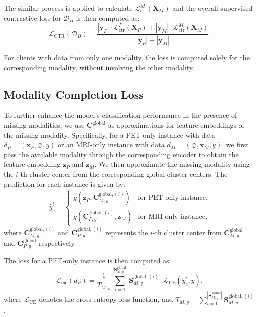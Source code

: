 The similar process is applied to calculate \( \mathcal{L}_{\text{ctr}}^M(\mathbf{X}_M) \) and the overall supervised contrastive loss for $\mathcal{D}_B$ is then computed as:
\begin{equation}
    \mathcal{L}_{\text{CTR}} (\mathcal{D}_B)= 
    \frac{
        |\mathbf{y}_P| \cdot \mathcal{L}_{\text{ctr}}^P(\mathbf{X}_P) 
        + 
        |\mathbf{y}_M| \cdot \mathcal{L}_{\text{ctr}}^M(\mathbf{X}_M)
    }{
        |\mathbf{y}_P| + |\mathbf{y}_M|
    }.
\end{equation}

For clients with data from only one modality, the loss is computed solely for the corresponding modality, without involving the other modality. 

\subsection{Modality Completion Loss}
To further enhance the model's classification performance in the presence of missing modalities, we use $\mathbf{C}^{\mathrm{global}}$ as approximations for feature embeddings of the missing modality. Specifically, for a PET-only instance with data \( d_P = (\mathbf{x}_P, \varnothing, y) \) or an MRI-only instance with data \( d_M = (\varnothing, \mathbf{x}_M, y) \), we first pass the available modality through the corresponding encoder to obtain the feature embedding \( \mathbf{z}_P \) and \( \mathbf{z}_M \). We then approximate the missing modality using the \( i \)-th cluster center from the corresponding global cluster centers. The prediction for each instance is given by:
\begin{equation}
\hat{y}_c^i = \begin{cases}
g(\mathbf{z}_P, \mathbf{C}_{M,y}^{\text{global},(i)}) & \text{for PET-only instance}, \\
g(\mathbf{C}_{P,y}^{\text{global},(i)}, \mathbf{z}_M) & \text{for MRI-only instance},
\end{cases}
\end{equation}
where \( \mathbf{C}_{M,y}^{\text{global},(i)} \) and \( \mathbf{C}_{P,y}^{\text{global},(i)} \) represents the \( i \)-th cluster center from \( \mathbf{C}_{M,y}^{\text{global}} \) and \( \mathbf{C}_{P,y}^{\text{global}} \) respectively.

The loss for a PET-only instance is then computed as:
\begin{equation}
\mathcal{L}_{\text{mc}}(d_P) =  \frac{1}{T_{M,y}} \sum_{i=1}^{|\mathbf{S}_{M,y}^{\text{global}}|} \mathbf{S}_{M,y}^{\text{global},(i)} \cdot \mathcal{L}_{\text{CE}}(\hat{y}_c^i, y),
\end{equation}
where \( \mathcal{L}_{\text{CE}} \) denotes the cross-entropy loss function, and \( T_{M,y} = \sum_{i=1}^{|\mathbf{S}_{M,y}^{\text{global}}|} \mathbf{S}_{M,y}^{\text{global},(i)} \).

